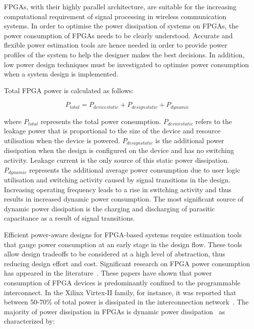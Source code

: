 FPGAs, with their highly parallel architecture, are suitable for the increasing computational requirement of signal processing in wireless communication systems.
In order to optimise the power dissipation of systems on FPGAs, the power consumption of FPGAs needs to be clearly understood. 
Accurate and flexible power estimation tools are hence needed in order to provide power profiles of the system to help the designer makes the best decisions.
In addition, low power design techniques must be investigated to optimise power consumption when a system design is implemented.

Total FPGA power is calculated as follows:
\begin{center}
\begin{equation}
\label{Equ:Ptotal}
 P_{\mathit{total}} = P_{\mathit{device static}} + P_{\mathit{design static}} + P_{\mathit{dynamic}}
\end{equation}
\end{center}
where $P_{\mathit{total}}$ represents the total power consumption. $P_{\mathit{device static}}$ refers to the leakage power that is proportional to the size of the device and resource utilisation when the device is powered. $P_{\mathit{design static}}$ is the additional power dissipation when the design is configured on the device and has no switching activity. Leakage current is the only source of this static power dissipation.
$P_{\mathit{dynamic}}$ represents the additional average power consumption due to user logic utilisation and switching activity caused by signal transitions in the design. Increasing operating frequency leads to a rise in switching activity and thus results in increased dynamic power consumption. The most significant source of dynamic power dissipation is the charging and discharging of parasitic capacitance as a result of signal transitions.

Efficient power-aware designs for FPGA-based systems require estimation tools that gauge power consumption at an early stage in the design flow.
These tools allow design tradeoffs to be considered at a high level of abstraction, thus reducing design effort and cost.
Significant research on FPGA power consumption has appeared in the literature~\cite{Shang2002,Anderson2004a,Anderson2004,Todorovich2005,Reimer2006}.
These papers have shown that power consumption of FPGA devices is predominantly confined to the programmable interconnect.
In the Xilinx Virtex-II family, for instance, it was reported that between 50-70\% of total power is dissipated in the interconnection network~\cite{Shang2002}.
The majority of power dissipation in FPGAs is dynamic power dissipation~\cite{Shang2002} as characterized by:

